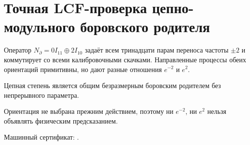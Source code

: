 \chapter{Точная LCF-проверка цепно-модульного боровского родителя}
Оператор $N_\partial=0I_{11}\oplus2I_{10}$ задаёт всем тринадцати
парам переноса частоты $\pm2$ и коммутирует со всеми калибровочными скачками.
Направленные процессы обеих ориентаций примитивны, но дают разные отношения
$e^{-2}$ и $e^2$.
\begin{theorem}Цепная степень является общим безразмерным боровским
родителем без непрерывного параметра.\end{theorem}
\begin{nogocriterion}Ориентация не выбрана прежним действием, поэтому ни
$e^{-2}$, ни $e^2$ нельзя объявлять физическим предсказанием.\end{nogocriterion}
Машинный сертификат: .